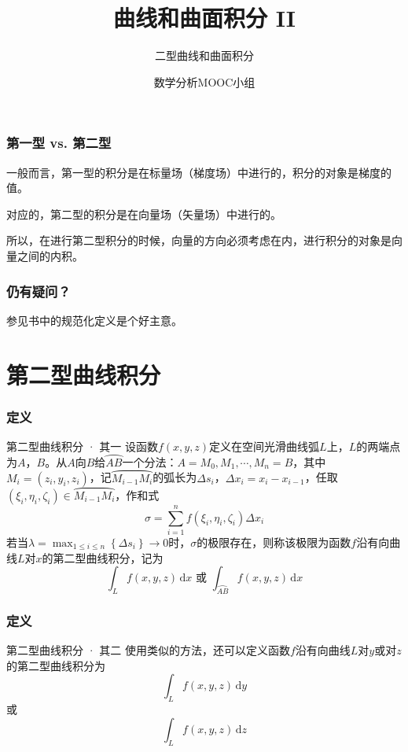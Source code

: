 \documentclass[xetex]{beamer}
\title{曲线和曲面积分 II}
\subtitle{二型曲线和曲面积分}
\author{数学分析MOOC小组}
\date{}
\begin{document}
    \frame{\maketitle}

    \begin{frame}
        \frametitle{第一型 vs. 第二型}
    
        一般而言，第一型的积分是在\alert{标量场}（\alert{梯度场}）中进行的，积分的对象是\alert{梯度的值}。\pause

        对应的，第二型的积分是在\alert{向量场}（\alert{矢量场}）中进行的。\pause

        所以，在进行第二型积分的时候，向量的方向必须考虑在内，进行积分的对象是\alert{向量之间的内积}。
    
    \end{frame}

    \begin{frame}
        \frametitle{仍有疑问？}
    
        参见书中的规范化定义是个好主意。
    
    \end{frame}

    \section{第二型曲线积分}

    \begin{frame}
        \frametitle{定义}
    
        \begin{block}{第二型曲线积分 · 其一}
            设函数$f(x,y,z)$定义在空间光滑曲线弧$L$上，$L$的两端点为$A$，$B$。从$A$向$B$给$\wideparen{AB}$一个分法：$A=M_0,M_1,\cdots,M_n=B$，其中$M_i=(z_i,y_i,z_i)$，记$\wideparen{M_{i-1}M_i}$的弧长为$\Delta s_i$，$\Delta x_i=x_i-x_{i-1}$，任取$(\xi_i,\eta_i,\zeta_i)\in\wideparen{M_{i-1}M_i}$，作和式$$\sigma=\sum_{i=1}^nf(\xi_i,\eta_i,\zeta_i)\Delta x_i$$
            若当$\displaystyle\lambda=\max_{1\leq i\leq n}\left\{\Delta s_i\right\}\to 0$时，$\sigma$的极限存在，则称该极限为\alert{函数$f$沿有向曲线$L$对$x$的第二型曲线积分}，记为$$\int_Lf(x,y,z)\,\mathrm{d}x\text{ 或 }\int_{\wideparen{AB}}f(x,y,z)\,\mathrm{d}x$$
        \end{block}
    
    \end{frame}

    \begin{frame}
        \frametitle{定义}
    
        \begin{block}{第二型曲线积分 · 其二}
            使用类似的方法，还可以定义\alert{函数$f$沿有向曲线$L$对$y$或对$z$的第二型曲线积分}为$$\int_Lf(x,y,z)\,\mathrm{d}y$$或$$\int_Lf(x,y,z)\,\mathrm{d}z$$
        \end{block}
    
    \end{frame}
\end{document}
